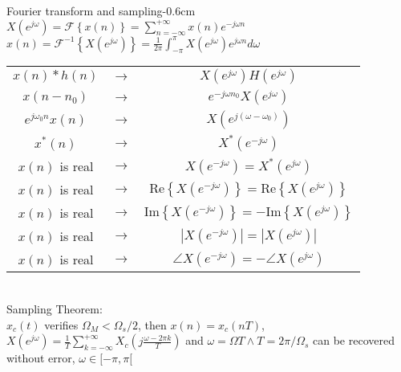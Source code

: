 \documentclass[10pt,3col]{cheatsheet}
\begin{document}
\begin{multicols*}{3}
\begin{cheatsheetbox}{Fourier transform and sampling}{-0.6cm}
	$X(e^{j\omega}) = \mathcal{F} \left\{x(n)\right\} = \sum_{n = -\infty}^{+\infty} x(n)e^{-j\omega n}$\\
    $x(n) = \mathcal{F}^{-1}\left\{X(e^{j\omega})\right\} = \frac{1}{2\pi} \int_{-\pi}^{\pi} X(e^{j\omega})e^{j\omega n} d\omega$\\
    \begin{tabular}{c c c}
	    $x(n) \ast h(n)$ & $\longrightarrow$ & $X(e^{j\omega})H(e^{j\omega})$ \\
	    $x(n - n_0)$ & $\longrightarrow$ & $e^{-j\omega n_0}X(e^{j\omega})$ \\
	    $e^{j\omega_0 n}x(n)$ & $\longrightarrow$ & $X(e^{j(\omega - \omega_0)})$ \\
        $x^\ast(n)$ & $\longrightarrow$ & $X^\ast(e^{-j\omega})$ \\
        $x(n)$ is real & $\longrightarrow$ & $X(e^{-j\omega}) = X^\ast(e^{j\omega})$ \\
        $x(n)$ is real & $\longrightarrow$ & $\mathrm{Re}\left\{X(e^{-j\omega})\right\} = \mathrm{Re}\left\{X(e^{j\omega})\right\}$ \\
        $x(n)$ is real & $\longrightarrow$ & $\mathrm{Im}\left\{X(e^{-j\omega})\right\} = -\mathrm{Im}\left\{X(e^{j\omega})\right\}$ \\
        $x(n)$ is real & $\longrightarrow$ & $\left|X(e^{-j\omega})\right| = \left|X(e^{j\omega})\right|$ \\
        $x(n)$ is real & $\longrightarrow$ & $\angle X(e^{-j\omega}) = - \angle X(e^{j\omega})$
	\end{tabular} \\
    Sampling Theorem:\\
    $x_c(t)$ verifies $\Omega_M < \Omega_s / 2$, then $x(n) = x_c(nT)$, $X(e^{j\omega}) = \frac{1}{T} \sum_{k = -\infty}^{+\infty} X_c\left(j\frac{\omega - 2\pi k}{T}\right)$ and $\omega = \Omega T \wedge T = 2 \pi / \Omega_s$ can be recovered without error, $\omega \in [-\pi, \pi[$\\
\end{cheatsheetbox}


\end{multicols*}
\end{document}
